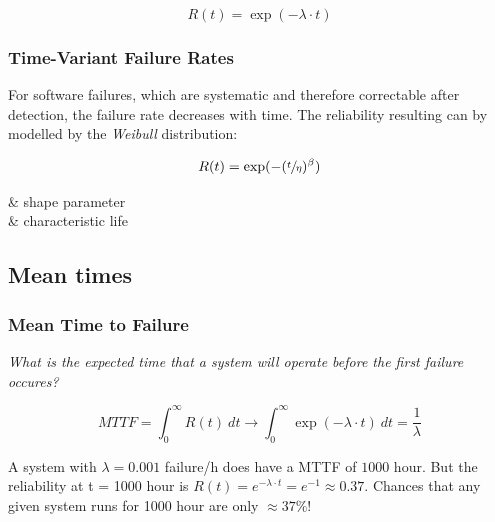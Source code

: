 \documentclass[
  10pt,
  a4paper,
]{article}
\makeatletter
\newenvironment{conditions*}
  {\par\vspace{\abovedisplayskip}\noindent
   \tabularx{\columnwidth}{>{$}l<{$} @{${}:{}$} >{\raggedright\arraybackslash}X}}
  {\endtabularx\par\vspace{\belowdisplayskip}}
\makeatother
\begin{document}
\begin{multicols*}{2}
\[
R(t)=\exp(-\lambda\cdot t)
\]

\subsubsection{Time-Variant Failure
Rates}\label{time-variant-failure-rates}

For software failures, which are systematic and therefore correctable
after detection, the failure rate decreases with time. The reliability
resulting can by modelled by the \emph{Weibull} distribution:

\[
R(t)=\exp(-(\sfrac{t}{\eta})^\beta)
\]

\begin{conditions*}
  \beta & shape parameter\\
  \eta & characteristic life
\end{conditions*}

\subsection{Mean times}\label{mean-times}

\subsubsection{Mean Time to Failure}\label{mean-time-to-failure}

\vspace{-2mm}{\color{Orchid}\faQuestionCircle[regular]} \emph{What is
the expected time that a system will operate before the first failure
occures?}

\[
MTTF=\int_0^\infty R(t)~dt\rightarrow\int_0^\infty \exp(-\lambda\cdot t)~dt=\frac{1}{\lambda}
\]

\begin{tcolorbox}[enhanced jigsaw, coltitle=black, toprule=.15mm, colframe=quarto-callout-caution-color-frame, breakable, titlerule=0mm, title=\textcolor{quarto-callout-caution-color}{\faFire}\hspace{0.5em}{Beware!}, toptitle=1mm, colback=white, leftrule=.75mm, bottomtitle=1mm, colbacktitle=quarto-callout-caution-color!10!white, left=2mm, bottomrule=.15mm, rightrule=.15mm, arc=.35mm, opacityback=0, opacitybacktitle=0.6]

{\small A system with $\lambda=0.001$ failure/h does have a MTTF of $1000$ hour. But the reliability at t = 1000 hour is $R(t)=e^{-\lambda\cdot t}=e^{-1}\approx 0.37$. Chances that any given system runs for 1000 hour are only $\approx37\%$!}


\end{tcolorbox}
\end{multicols*}
\end{document}
